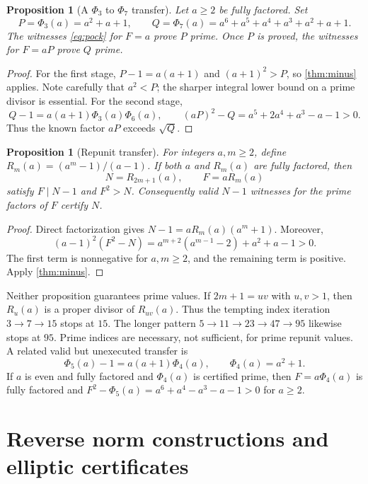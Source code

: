 \documentclass[11pt,a4paper]{article}
\newtheorem{proposition}[theorem]{Proposition}
\theoremstyle{definition}\newtheorem{definition}[theorem]{Definition}
\theoremstyle{remark}\newtheorem{remark}[theorem]{Remark}
\begin{document}
\begin{proposition}[A $\Phi_3$ to $\Phi_7$ transfer]\label{prop:phi}
Let $a\ge2$ be fully factored. Set
\[
 P=\Phi_3(a)=a^2+a+1,\qquad
 Q=\Phi_7(a)=a^6+a^5+a^4+a^3+a^2+a+1.
\]
The witnesses \eqref{eq:pock} for $F=a$ prove $P$ prime. Once $P$ is proved,
the witnesses for $F=aP$ prove $Q$ prime.
\end{proposition}

\begin{proof}
For the first stage, $P-1=a(a+1)$ and $(a+1)^2>P$, so
\cref{thm:minus} applies. Note carefully that $a^2<P$; the sharper integral
lower bound on a prime divisor is essential. For the second stage,
\[
 Q-1=a(a+1)\Phi_3(a)\Phi_6(a),\qquad
 (aP)^2-Q=a^5+2a^4+a^3-a-1>0.
\]
Thus the known factor $aP$ exceeds $\sqrt Q$.
\end{proof}

\begin{proposition}[Repunit transfer]\label{prop:repunit}
For integers $a,m\ge2$, define $R_m(a)=(a^m-1)/(a-1)$. If both $a$ and
$R_m(a)$ are fully factored, then
\[
 N=R_{2m+1}(a),\qquad F=aR_m(a)
\]
satisfy $F\mid N-1$ and $F^2>N$. Consequently valid $N-1$ witnesses for the
prime factors of $F$ certify $N$.
\end{proposition}

\begin{proof}
Direct factorization gives $N-1=aR_m(a)(a^m+1)$. Moreover,
\begin{equation}\label{eq:repdiff}
 (a-1)^2(F^2-N)
 =a^{m+2}(a^{m-1}-2)+a^2+a-1>0.
\end{equation}
The first term is nonnegative for $a,m\ge2$, and the remaining term is
positive. Apply \cref{thm:minus}.
\end{proof}

Neither proposition guarantees prime values. If $2m+1=uv$ with $u,v>1$, then
$R_u(a)$ is a proper divisor of $R_{uv}(a)$. Thus the tempting index iteration
$3\to7\to15$ stops at $15$. The longer pattern $5\to11\to23\to47\to95$
likewise stops at $95$. Prime indices are necessary, not sufficient, for prime
repunit values. A related valid but unexecuted transfer is
\[
 \Phi_5(a)-1=a(a+1)\Phi_4(a),\qquad \Phi_4(a)=a^2+1.
\]
If $a$ is even and fully factored and $\Phi_4(a)$ is certified prime, then
$F=a\Phi_4(a)$ is fully factored and
$F^2-\Phi_5(a)=a^6+a^4-a^3-a-1>0$ for $a\ge2$.

\section{Reverse norm constructions and elliptic certificates}
\label{sec:cm}
\end{document}
